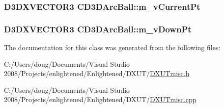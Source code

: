 \label{class_c_d3_d_arc_ball_a6075b159b5221b3091e32b090c0dcab3}
\hypertarget{class_c_d3_d_arc_ball_a759c768375a12e49cfdad6d141e60d21}{
\subsubsection[{m\_\-vCurrentPt}]{\setlength{\rightskip}{0pt plus 5cm}D3DXVECTOR3 {\bf CD3DArcBall::m\_\-vCurrentPt}}}
\label{class_c_d3_d_arc_ball_a759c768375a12e49cfdad6d141e60d21}
\hypertarget{class_c_d3_d_arc_ball_a702ae593d9a99c473c33bc762b6034de}{
\subsubsection[{m\_\-vDownPt}]{\setlength{\rightskip}{0pt plus 5cm}D3DXVECTOR3 {\bf CD3DArcBall::m\_\-vDownPt}}}
\label{class_c_d3_d_arc_ball_a702ae593d9a99c473c33bc762b6034de}


The documentation for this class was generated from the following files:\begin{DoxyCompactItemize}
\item 
C:/Users/doug/Documents/Visual Studio 2008/Projects/enlightened/Enlightened/DXUT/\hyperlink{_d_x_u_tmisc_8h}{DXUTmisc.h}\item 
C:/Users/doug/Documents/Visual Studio 2008/Projects/enlightened/Enlightened/DXUT/\hyperlink{_d_x_u_tmisc_8cpp}{DXUTmisc.cpp}\end{DoxyCompactItemize}
